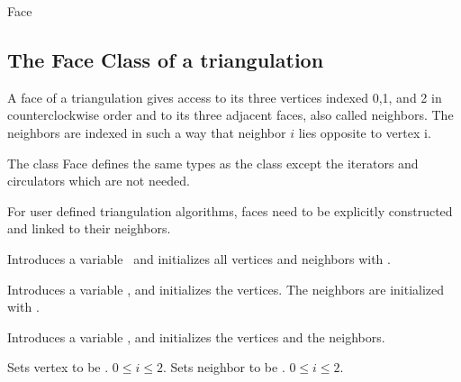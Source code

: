 \begin{ccClass} {Face}
\subsection{The Face  Class of a triangulation}
\label{I1_Sect_Triangulation_Face}
\def\ccTagRmEigenClassName{\ccFalse}

\ccDefinition
A face of a triangulation gives access to its three
vertices indexed 0,1, and 2 in counterclockwise order
and to its three adjacent faces, also called neighbors.
The neighbors are indexed in such a way that neighbor $i$ lies
opposite to vertex i. 


\ccTypes
The class  {Face} defines the same types 
as the class  except the iterators and circulators
which are not needed.


\begin{ccAdvanced}

For user defined triangulation algorithms, faces need to
be explicitly constructed and linked to their neighbors.

{Introduces a variable \ccVar\ and initializes all vertices and neighbors 
 with .}

{Introduces a variable \ccVar, and initializes the vertices. The 
neighbors are initialized with .}

{Introduces a variable \ccVar, and initializes the vertices and the neighbors.}

\end{ccAdvanced} 


\begin{ccAdvanced}

{Sets vertex  to be .
\ccPrecond $0\leq i \leq 2$.
}
\ccGlue
{}
{Sets neighbor  to be .
\ccPrecond $0\leq i \leq 2$.
}
\ccGlue
{}
\ccGlue
{}
\ccGlue
{}
\ccGlue
{}
\end{ccAdvanced} 



\end{ccClass}
